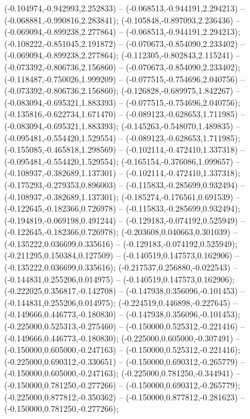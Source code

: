  (-0.104974,-0.942993,2.252833) -- (-0.068513,-0.944191,2.294213) -- (-0.068881,-0.990816,2.283841);
 (-0.105848,-0.897093,2.236436) -- (-0.069094,-0.899238,2.277864) -- (-0.068513,-0.944191,2.294213);
 (-0.108222,-0.851045,2.191872) -- (-0.070673,-0.854090,2.233402) -- (-0.069094,-0.899238,2.277864);
 (-0.112305,-0.802843,2.115241) -- (-0.073392,-0.806736,2.156860) -- (-0.070673,-0.854090,2.233402);
 (-0.118487,-0.750026,1.999209) -- (-0.077515,-0.754696,2.040756) -- (-0.073392,-0.806736,2.156860);
 (-0.126828,-0.689975,1.842267) -- (-0.083094,-0.695321,1.883393) -- (-0.077515,-0.754696,2.040756);
 (-0.135816,-0.622734,1.671470) -- (-0.089123,-0.628653,1.711985) -- (-0.083094,-0.695321,1.883393);
 (-0.145263,-0.548070,1.489835) -- (-0.095481,-0.554420,1.529554) -- (-0.089123,-0.628653,1.711985);
 (-0.155085,-0.465818,1.298569) -- (-0.102114,-0.472410,1.337318) -- (-0.095481,-0.554420,1.529554);
 (-0.165154,-0.376086,1.099657) -- (-0.108937,-0.382689,1.137301) -- (-0.102114,-0.472410,1.337318);
 (-0.175293,-0.279353,0.896003) -- (-0.115833,-0.285699,0.932494) -- (-0.108937,-0.382689,1.137301);
 (-0.185274,-0.176561,0.691539) -- (-0.122645,-0.182366,0.726978) -- (-0.115833,-0.285699,0.932494);
 (-0.194819,-0.069198,0.491244) -- (-0.129183,-0.074192,0.525949) -- (-0.122645,-0.182366,0.726978);
 (-0.203608,0.040663,0.301039) -- (-0.135222,0.036699,0.335616) -- (-0.129183,-0.074192,0.525949);
 (-0.211295,0.150384,0.127509) -- (-0.140519,0.147573,0.162906) -- (-0.135222,0.036699,0.335616);
 (-0.217537,0.256880,-0.022543) -- (-0.144831,0.255206,0.014975) -- (-0.140519,0.147573,0.162906);
 (-0.222025,0.356817,-0.142708) -- (-0.147938,0.356096,-0.101453) -- (-0.144831,0.255206,0.014975);
 (-0.224519,0.446898,-0.227645) -- (-0.149666,0.446773,-0.180830) -- (-0.147938,0.356096,-0.101453);
 (-0.225000,0.525313,-0.275460) -- (-0.150000,0.525312,-0.221416) -- (-0.149666,0.446773,-0.180830);
 (-0.225000,0.605000,-0.307491) -- (-0.150000,0.605000,-0.247163) -- (-0.150000,0.525312,-0.221416);
 (-0.225000,0.690312,-0.330651) -- (-0.150000,0.690312,-0.265779) -- (-0.150000,0.605000,-0.247163);
 (-0.225000,0.781250,-0.344941) -- (-0.150000,0.781250,-0.277266) -- (-0.150000,0.690312,-0.265779);
 (-0.225000,0.877812,-0.350362) -- (-0.150000,0.877812,-0.281623) -- (-0.150000,0.781250,-0.277266);
